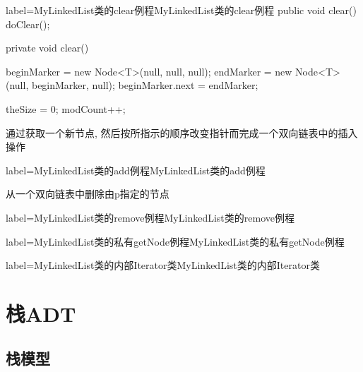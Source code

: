 \documentclass[oneside]{ctexbook}
\begin{document}
\begin{myjava}{label={MyLinkedList类的clear例程}}{MyLinkedList类的clear例程}
public void clear() {
    doClear();
}

private void clear() {
    beginMarker = new Node<T>(null, null, null);
    endMarker = new Node<T>(null, beginMarker, null);
    beginMarker.next = endMarker;

    theSize = 0;
    modCount++;
}
\end{myjava}

\begin{myfigure}[label={双向链表的插入操作}]{通过获取一个新节点, 然后按所指示的顺序改变指针而完成一个双向链表中的插入操作}\scalebox{1}{\begin{tikzpicture}

\end{tikzpicture}}\end{myfigure}

\begin{myjava}{label={MyLinkedList类的add例程}}{MyLinkedList类的add例程}
\end{myjava}

\begin{myfigure}[label={从一个双向链表中删除由p指定的节点}]{从一个双向链表中删除由p指定的节点}\scalebox{1}{\begin{tikzpicture}

\end{tikzpicture}}\end{myfigure}

\begin{myjava}{label={MyLinkedList类的remove例程}}{MyLinkedList类的remove例程}

\end{myjava}

\begin{myjava}{label={MyLinkedList类的私有getNode例程}}{MyLinkedList类的私有getNode例程}
\end{myjava}

\begin{myjava}{label={MyLinkedList类的内部Iterator类}}{MyLinkedList类的内部Iterator类}
\end{myjava}

\section{栈ADT}

\subsection{栈模型}
\end{document}

